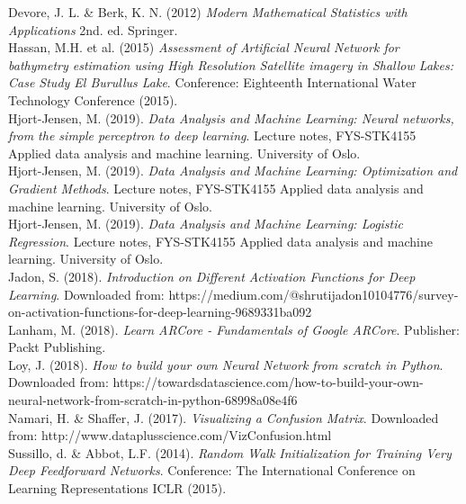 \documentclass[11pt,english, A4]{article}
\begin{document}
Devore, J. L. \& Berk, K. N. (2012) \textit{Modern Mathematical Statistics with Applications} 2nd. ed. Springer. \\

Hassan, M.H. et al. (2015) \textit{Assessment of Artificial Neural Network for bathymetry estimation using High Resolution Satellite imagery in Shallow Lakes: Case Study El Burullus Lake}. Conference: Eighteenth International Water Technology Conference (2015).\\

Hjort-Jensen, M. (2019). \textit{Data Analysis and Machine Learning: Neural networks, from the simple perceptron to deep learning}. Lecture notes, FYS-STK4155 Applied data analysis and machine learning. University of Oslo.\\

Hjort-Jensen, M. (2019). \textit{Data Analysis and Machine Learning: Optimization and Gradient Methods}. Lecture notes, FYS-STK4155 Applied data analysis and machine learning. University of Oslo.\\

Hjort-Jensen, M. (2019). \textit{Data Analysis and Machine Learning: Logistic Regression}. Lecture notes, FYS-STK4155 Applied data analysis and machine learning. University of Oslo.\\

Jadon, S. (2018). \textit{Introduction on Different Activation Functions for Deep Learning}. 
Downloaded from: https://medium.com/@shrutijadon10104776/survey-on-activation-functions-for-deep-learning-9689331ba092\\

Lanham, M. (2018). \textit{Learn ARCore - Fundamentals of Google ARCore}. Publisher: Packt Publishing.\\

Loy, J. (2018). \textit{How to build your own Neural Network from scratch in Python}.\\
Downloaded from: https://towardsdatascience.com/how-to-build-your-own-neural-network-from-scratch-in-python-68998a08e4f6\\

Namari, H. \& Shaffer, J. (2017). \textit{Visualizing a Confusion Matrix}. 
Downloaded from: http://www.dataplusscience.com/VizConfusion.html\\

Sussillo, d. \& Abbot, L.F. (2014). \textit{Random Walk Initialization for Training Very Deep Feedforward Networks}. Conference: The International Conference on Learning Representations ICLR (2015).\\
\end{document}
